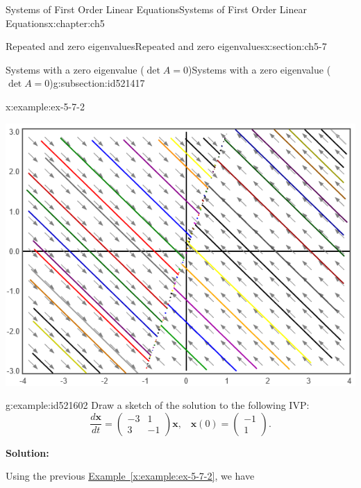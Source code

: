 \documentclass[oneside,10pt,]{book}
\newcommand{\xreffont}{\relax}
\newcommand{\terminology}[1]{\textbf{#1}}
\numberwithin{equation}{section}
\numberwithin{equation}{section}
\newcommand{\amp}{&}
\begin{document}
\begin{chapterptx}{Systems of First Order Linear Equations}{}{Systems of First Order Linear Equations}{}{}{x:chapter:ch5}
\begin{sectionptx}{Repeated and zero eigenvalues}{}{Repeated and zero eigenvalues}{}{}{x:section:ch5-7}
\begin{subsectionptx}{Systems with a zero eigenvalue (\(\det A=0 \))}{}{Systems with a zero eigenvalue (\(\det A=0 \))}{}{}{g:subsection:id521417}
\begin{example}{}{x:example:ex-5-7-2}
\begin{image}{0}{1}{0}
\includegraphics[width=\linewidth]{images/7.8-1c.png}
\end{image}%
\end{example}
\begin{example}{}{g:example:id521602}%
Draw a sketch of the solution to the following IVP:%
\begin{equation*}
\frac{d\mathbf{x}}{dt}=\left(\begin{array}{cc}
-3 \amp 1\\
3 \amp -1
\end{array}\right)\mathbf{x},\,\,\,\,\,\mathbf{x}(0)=\left(\begin{array}{c}
-1\\
1
\end{array}\right).
\end{equation*}
%
\par
\terminology{Solution:}%
\par
Using the previous \hyperref[x:example:ex-5-7-2]{Example~{\xreffont\ref{x:example:ex-5-7-2}}}, we have%
\begin{image}{0}{1}{0}%

\end{image}
\end{example}
\end{subsectionptx}
\end{sectionptx}
\end{chapterptx}
\end{document}
